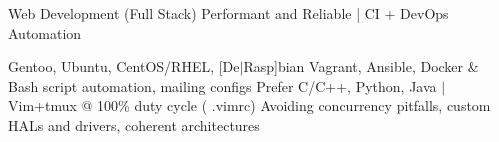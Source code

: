 \documentclass[../main.tex]{subfiles}%
\begin{document}
%
{Web Development (Full Stack)}
{Performant and Reliable | CI + DevOps Automation}
%
{\begin{adjustwidth}{1.2in}{0in}
		{Gentoo, Ubuntu, CentOS/RHEL, [De$\vert$Rasp]bian}
		{Vagrant, Ansible, Docker \& Bash script automation, mailing configs}
		{Prefer C/C++, Python, Java $\vert$ Vim+tmux @ 100\% duty cycle
			(
			{.vimrc})}
		{Avoiding concurrency pitfalls, custom HALs and drivers,
			coherent architectures}
\end{adjustwidth}}
\end{document}
